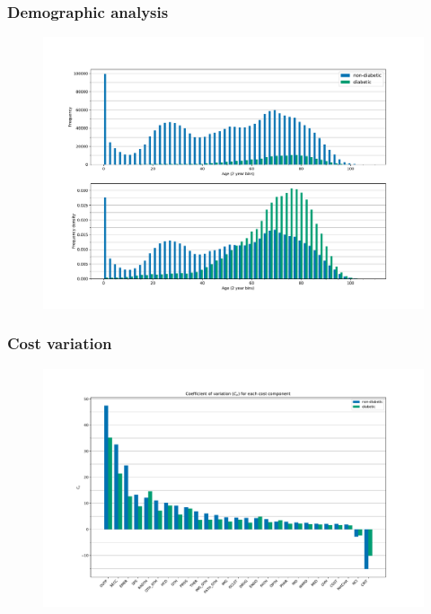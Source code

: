 \documentclass{beamer}
\begin{document}
\begin{frame}
    \frametitle{Demographic analysis}

    \begin{figure}
    \includegraphics[width=\linewidth]{./img/diabetic_age_joint_hist.pdf}
    \end{figure}
\end{frame}

\begin{frame}
    \frametitle{Cost variation}

    \begin{figure}
    \includegraphics[width=\linewidth]{./img/diabetic_coeff_variation.pdf}
    \end{figure}
\end{frame}
\end{document}
